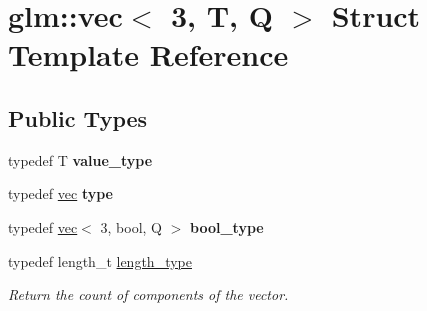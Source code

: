 \hypertarget{structglm_1_1vec_3_013_00_01T_00_01Q_01_4}{}\section{glm\+:\+:vec$<$ 3, T, Q $>$ Struct Template Reference}
\label{structglm_1_1vec_3_013_00_01T_00_01Q_01_4}
\subsection*{Public Types}
\begin{DoxyCompactItemize}
\item 
\mbox{\label{structglm_1_1vec_3_013_00_01T_00_01Q_01_4_ac9d049f83235863ada16f91e67d28e3f}} 
typedef T {\bfseries value\+\_\+type}
\item 
\mbox{\label{structglm_1_1vec_3_013_00_01T_00_01Q_01_4_aab5e53af2d54d8353fecdd9071c14560}} 
typedef \hyperlink{structglm_1_1vec}{vec} {\bfseries type}
\item 
\mbox{\label{structglm_1_1vec_3_013_00_01T_00_01Q_01_4_a8574623d0fe3b330e18c10b8d5022ca6}} 
typedef \hyperlink{structglm_1_1vec}{vec}$<$ 3, bool, Q $>$ {\bfseries bool\+\_\+type}
\item 
\mbox{\label{structglm_1_1vec_3_013_00_01T_00_01Q_01_4_ab586a87f82719bfdd180336a98843257}} 
typedef length\+\_\+t \hyperlink{structglm_1_1vec_3_013_00_01T_00_01Q_01_4_ab586a87f82719bfdd180336a98843257}{length\+\_\+type}
\begin{DoxyCompactList}\small\item\em Return the count of components of the vector. \end{DoxyCompactList}\end{DoxyCompactItemize}
